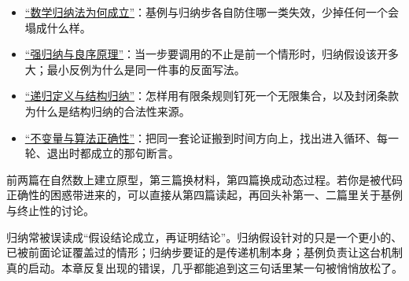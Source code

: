 \begin{itemize}
\tightlist
\item \hyperref[sec:01-Mathematical-Language/04-Induction-and-Recursion/01]{``数学归纳法为何成立''}：基例与归纳步各自防住哪一类失效，少掉任何一个会塌成什么样。
\item \hyperref[sec:01-Mathematical-Language/04-Induction-and-Recursion/02]{``强归纳与良序原理''}：当一步要调用的不止是前一个情形时，归纳假设该开多大；最小反例为什么是同一件事的反面写法。
\item \hyperref[sec:01-Mathematical-Language/04-Induction-and-Recursion/03]{``递归定义与结构归纳''}：怎样用有限条规则钉死一个无限集合，以及封闭条款为什么是结构归纳的合法性来源。
\item \hyperref[sec:01-Mathematical-Language/04-Induction-and-Recursion/04]{``不变量与算法正确性''}：把同一套论证搬到时间方向上，找出进入循环、每一轮、退出时都成立的那句断言。
\end{itemize}

前两篇在自然数上建立原型，第三篇换材料，第四篇换成动态过程。若你是被代码正确性的困惑带进来的，可以直接从第四篇读起，再回头补第一、二篇里关于基例与终止性的讨论。

归纳常被误读成``假设结论成立，再证明结论''。归纳假设针对的只是一个更小的、已被前面论证覆盖过的情形；归纳步要证的是传递机制本身；基例负责让这台机制真的启动。本章反复出现的错误，几乎都能追到这三句话里某一句被悄悄放松了。
